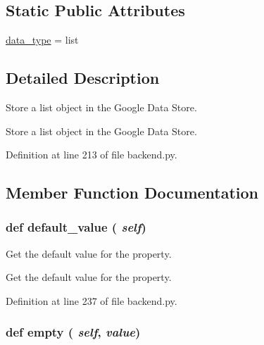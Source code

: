 \subsection*{Static Public Attributes}
\begin{DoxyCompactItemize}
\item 
\hyperlink{classbackend_1_1_generic_list_property_ac2ad7f431e3446fddcd9b6b9f93c4c14}{data\_\-type} = list
\end{DoxyCompactItemize}


\subsection{Detailed Description}
Store a list object in the Google Data Store. \begin{DoxyVerb}Store a list object in the Google Data Store.\end{DoxyVerb}
 

Definition at line 213 of file backend.py.

\subsection{Member Function Documentation}
\hypertarget{classbackend_1_1_generic_list_property_a64bfffc058d933b3b0599f5bc7c049d1}{
\subsubsection[{default\_\-value}]{\setlength{\rightskip}{0pt plus 5cm}def default\_\-value ( {\em self})}}
\label{classbackend_1_1_generic_list_property_a64bfffc058d933b3b0599f5bc7c049d1}


Get the default value for the property. \begin{DoxyVerb}Get the default value for the property.\end{DoxyVerb}
 

Definition at line 237 of file backend.py.\hypertarget{classbackend_1_1_generic_list_property_aad7084fad37d1cf9b41a738ecfbbd249}{
\subsubsection[{empty}]{\setlength{\rightskip}{0pt plus 5cm}def empty ( {\em self}, \/   {\em value})}}
\label{classbackend_1_1_generic_list_property_aad7084fad37d1cf9b41a738ecfbbd249}


